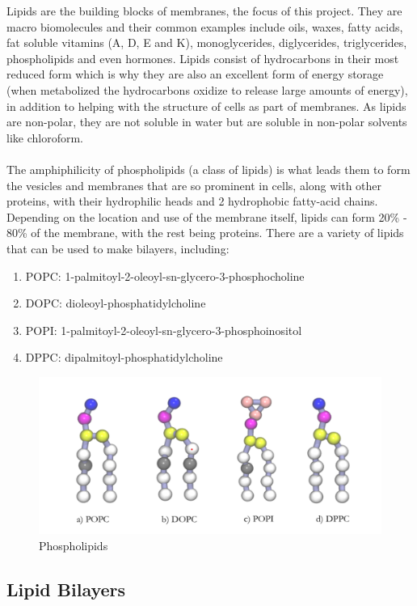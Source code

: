 \documentclass[12pt, a4paper]{report}
\begin{document}
Lipids are the building blocks of membranes, the focus of this project. They are macro biomolecules and their common examples include oils, waxes, fatty acids, fat soluble vitamins (A, D, E and K), monoglycerides, diglycerides, triglycerides, phospholipids and even hormones. Lipids consist of hydrocarbons in their most reduced form which is why they are also an excellent form of energy storage (when metabolized the hydrocarbons oxidize to release large amounts of energy), in addition to helping with the structure of cells as part of membranes. As lipids are non-polar, they are not soluble in water but are soluble in non-polar solvents like chloroform. 
\\~\\
The amphiphilicity of phospholipids (a class of lipids) is what leads them to form the vesicles and membranes that are so prominent in cells, along with other proteins, with their hydrophilic heads and 2 hydrophobic fatty-acid chains. Depending on the location and use of the membrane itself, lipids can form 20\% - 80\% of the membrane, with the rest being proteins. There are a variety of lipids that can be used to make bilayers, including: 
\begin{enumerate}
\item POPC: 1-palmitoyl-2-oleoyl-sn-glycero-3-phosphocholine
\item DOPC: dioleoyl-phosphatidylcholine
\item POPI: 1-palmitoyl-2-oleoyl-sn-glycero-3-phosphoinositol
\item DPPC: dipalmitoyl-phosphatidylcholine
\end{enumerate}


\begin{figure}[h]
\includegraphics[scale=0.5]{images/lipids with labels.png} 
\centering 
\caption{Phospholipids} 
\centering 
\end{figure} 


\subsection*{Lipid Bilayers} 
\end{document}
